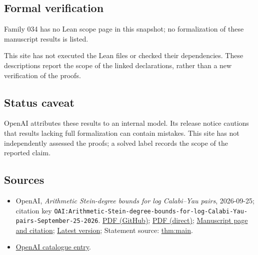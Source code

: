 \documentclass[11pt]{article}
\begin{document}
\subsection{Formal verification}
Family 034 has no Lean scope page in this snapshot; no formalization of these manuscript results is listed.

This site has not executed the Lean files or checked their dependencies. These descriptions report the scope of the linked declarations, rather than a new verification of the proofs.

\subsection{Status caveat}
OpenAI attributes these results to an internal model. Its release notice cautions that results lacking full formalization can contain mistakes. This site has not independently assessed the proofs; a solved label records the scope of the reported claim.

\subsection{Sources}
\begin{itemize}
\item OpenAI, \emph{Arithmetic Stein-degree bounds for log Calabi–Yau pairs}, 2026-09-25; citation key \texttt{OAI:Arithmetic-Stein-degree-bounds-for-log-Calabi-Yau-pairs-September-25-2026}. \href{https://github.com/openai/math/blob/adc7f1241b42e322a6451854ab7e4b4c146bf78a/preprints/Arithmetic-Stein-degree-bounds-for-log-Calabi-Yau-pairs-September-25-2026/paper.pdf}{PDF (GitHub)}; \href{https://github.com/openai/math/raw/adc7f1241b42e322a6451854ab7e4b4c146bf78a/preprints/Arithmetic-Stein-degree-bounds-for-log-Calabi-Yau-pairs-September-25-2026/paper.pdf}{PDF (direct)}; \href{https://github.com/openai/math/blob/adc7f1241b42e322a6451854ab7e4b4c146bf78a/preprints/Arithmetic-Stein-degree-bounds-for-log-Calabi-Yau-pairs-September-25-2026/README.md}{Manuscript page and citation}; \href{https://github.com/openai/math/blob/main/preprints/Arithmetic-Stein-degree-bounds-for-log-Calabi-Yau-pairs-September-25-2026/paper.pdf}{Latest version}; Statement source: \href{https://github.com/openai/math/blob/adc7f1241b42e322a6451854ab7e4b4c146bf78a/preprints/Arithmetic-Stein-degree-bounds-for-log-Calabi-Yau-pairs-September-25-2026/build/paper.tex\#L89}{thm:main}.
\item \href{https://github.com/openai/math/blob/adc7f1241b42e322a6451854ab7e4b4c146bf78a/CONTENTS.md}{OpenAI catalogue entry}.
\end{itemize}
\end{document}
